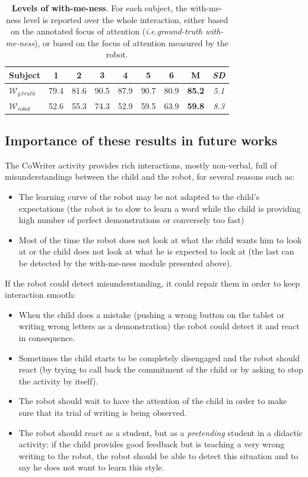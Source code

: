 \documentclass[10pt,a4paper]{article}
\newcommand{\ie}{\textit{i.e.}\xspace}
\begin{document}
\begin{table}[h!]
    \centering
    \caption{\textbf{Levels of with-me-ness}. For each subject, the with-me-ness
    level is reported over the whole interaction, either based on the
    annotated focus of attention (\ie \emph{ground-truth with-me-ness}), or based on the focus of
    attention measured by the robot.}

    \begin{tabular}{p{1cm}cccccccc}
        \toprule
        Subject & 1 & 2 & 3 & 4 & 5 & 6 & {\bf M} & {\it SD} \\
        \midrule
        $\mathcal{W}_{g.truth}$ & 79.4 & 81.6  & 90.5 & 87.9 & 90.7 & 80.9 & {\bf 85.2} & {\it 5.1} \\ 
        $\mathcal{W}_{robot}$ & 52.6 & 55.3 & 74.3 & 52.9 & 59.5 & 63.9 & {\bf 59.8} & {\it 8.3} \\
        \bottomrule
    \end{tabular}
    \label{tab:results-with-me-ness}
\end{table}

\subsection{Importance of these results in future works}\label{futur}
The CoWriter activity provides rich interactions, mostly non-verbal, full of misunderstandings between the child and the robot, for several reasons such as:
\begin{itemize}
\item The learning curve of the robot may be not adapted to the child's expectations (the robot is to slow to learn a word while the child is providing high number of perfect demonstrations or conversely too fast)
\item Most of the time the robot does not look at what the child wants him to look at or the child does not look at what he is expected to look at (the last can be detected by the with-me-ness module presented above). 
\end{itemize}
If the robot could detect misunderstanding, it could repair them in order to keep interaction smooth:
\begin{itemize}
\item When the child does a mistake (pushing a wrong button on the tablet or writing wrong letters as a demonstration) the robot could detect it and react in consequence.
\item Sometimes the child starts to be completely disengaged and the robot should react (by trying to call back the commitment of the child or by asking to stop the activity by itself).
\item The robot should wait to have the attention of the child in order to make sure that its trial of writing is being observed.
\item The robot should react as a student, but as a \textit{pretending} student in a didactic activity: if the child provides good feedback but is teaching a very wrong writing to the robot, the robot should be able to detect this situation and to say he does not want to learn this style. 
\end{itemize}
\end{document}

